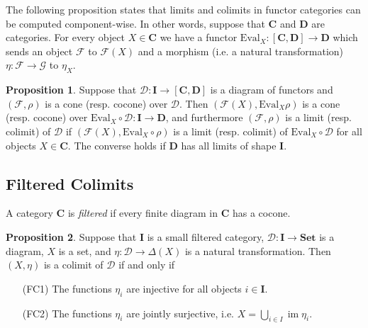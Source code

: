 \documentclass[oneside,11pt]{amsart}
\newcommand{\bC}{\ensuremath{\textbf{C}}}
\newcommand{\bD}{\ensuremath{\textbf{D}}}
\newcommand{\bI}{\ensuremath{\textbf{I}}}
\newcommand{\bSet}{\ensuremath{\textbf{Set}}}
\newcommand{\mF}{\ensuremath{\mathcal{F}}}
\newcommand{\mG}{\ensuremath{\mathcal{G}}}
\newcommand{\mD}{\ensuremath{\mathcal{D}}}
\newcommand{\eval}{\ensuremath{\text{Eval}}}
\newcommand{\im}{\operatorname{im}}
\theoremstyle{definition}
\newtheorem{proof techniques}{Proof Techniques}
\newtheorem{proposition}{Proposition}
\begin{document}
The following proposition states that limits and colimits in functor categories can be computed component-wise. In other words, suppose that $\bC$ and $\bD$ are categories. For every object $X \in \bC$ we have a functor $\eval_X : [\bC , \bD] \to \bD$ which sends an object $\mF$ to $\mF(X)$ and a morphism (i.e. a natural transformation) $\eta : \mF \to \mG$ to $\eta_X$. 

\begin{proposition}\label{prop: limits and colimits in functor categories}
Suppose that $\mD : \bI \to [\bC, \bD]$ is a diagram of functors and $(\mF , \rho)$ is a cone (resp. cocone) over $\mD$. Then $(\mF(X) , \eval_X  \rho)$ is a cone (resp. cocone) over $\eval_X \circ \mD: \bI \to \bD$, and furthermore $(\mF , \rho)$ is a limit (resp. colimit) of $\mD$ if $(\mF(X) , \eval_X \circ \rho)$ is a limit (resp. colimit) of $\eval_X \circ \mD$ for all objects $X \in \bC$. The converse holds if $\bD$ has all limits of shape $\bI$.
\end{proposition}



\subsection{Filtered Colimits}

A category $\bC$ is \emph{filtered} if every finite diagram in $\bC$ has a cocone. 

\begin{proposition}\label{prop: filtered colimits of sets}
Suppose that $\bI$ is a small filtered category, $\mD : \bI \to \bSet$ is a diagram, $X$ is a set, and $\eta : \mD \to \Delta(X)$ is a natural transformation. Then $(X , \eta)$ is a colimit of $\mD$ if and only if 
\begin{itemize}

\item[(FC1)] The functions $\eta_i$ are injective for all objects $i \in \bI$. 

\item[(FC2)] The functions $\eta_i$ are jointly surjective, i.e. $X = \bigcup_{i \in I} \im \eta_i$. 

\end{itemize}
\end{proposition}
\end{document}
